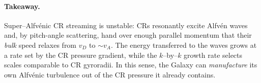 \paragraph{Takeaway.}
Super–Alfv\'enic CR streaming is unstable: CRs resonantly excite Alfv\'en waves and, by pitch-angle scattering, hand over enough parallel momentum that their \emph{bulk} speed relaxes from $v_D$ to $\sim v_A$. The energy transferred to the waves grows at a rate set by the CR pressure gradient, while the $k$–by–$k$ growth rate selects scales comparable to CR gyroradii. In this sense, the Galaxy can \emph{manufacture} its own Alfv\'enic turbulence out of the CR pressure it already contains.




%
%
%
